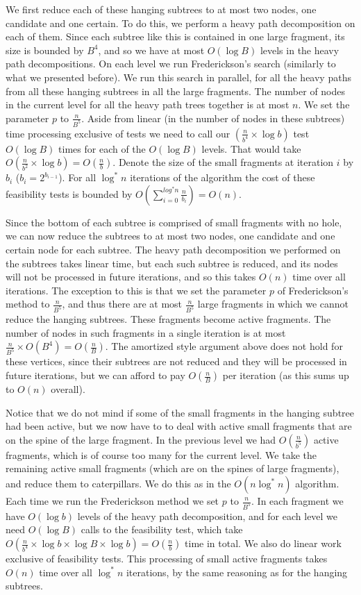 \documentclass[11pt,a4paper]{article}
\theoremstyle{definition}
\theoremstyle{remark}
\begin{document}
We first reduce each of these hanging subtrees to at most two nodes, one candidate and one certain. To do this, we perform a heavy path decomposition on each of them. Since each subtree like this is contained in one large fragment, its size is bounded by $B^4$, and so we have at most $O(\log B)$ levels in the heavy path decompositions. On each level we run Frederickson's search (similarly to what we presented before). We run this search in parallel, for all the heavy paths from all these hanging subtrees in all the large fragments. The number of nodes in the current level for all the heavy path trees together is at most $n$. We set the parameter $p$ to $\frac{n}{B^5}$. Aside from linear (in the number of nodes in these subtrees) time processing exclusive of tests we need to call our $(\frac{n}{b^4} \times \log b)$ test $O(\log B)$ times for each of the $O(\log B)$ levels. That would take $O(\frac{n}{b^2} \times \log b) = O(\frac{n}{b})$. Denote the size of the small fragments at iteration $i$ by $b_i$ ($b_i=2^{b_{i-1}}$). For all $\log ^*n$ iterations of the algorithm the cost of these feasibility tests is bounded by $O(\sum_{i=0}^{log^*n} \frac{n}{b_i}) = O(n)$.

Since the bottom of each subtree is comprised of small fragments with no hole, we can now reduce the subtrees to at most two nodes, one candidate and one certain node for each subtree. The heavy path decomposition we performed on the subtrees takes linear time, but each such subtree is reduced, and its nodes will not be processed in future iterations, and so this takes $O(n)$ time over all iterations. The exception to this is that we set the parameter $p$ of Frederickson's method to $\frac{n}{B^5}$, and thus there are at most $\frac{n}{B^5}$ large fragments in which we cannot reduce the hanging subtrees. These fragments become active fragments. The number of nodes in such fragments in a single iteration is at most $\frac{n}{B^5} \times O(B^4) = O(\frac{n}{B})$. The amortized style argument above does not hold for these vertices, since their subtrees are not reduced and they will be processed in future iterations, but we can afford to pay $O(\frac{n}{B})$ per iteration (as this sums up to $O(n)$ overall).

Notice that we do not mind if some of the small fragments in the hanging subtree had been active, but we now have to to deal with active small fragments that are on the spine of the large fragment. In the previous level we had $O(\frac{n}{b^5})$ active fragments, which is of course too many for the current level. We take the remaining active small fragments (which are on the spines of large fragments), and reduce them to caterpillars. We do this as in the $O(n \log^* n)$ algorithm. Each time we run the Frederickson method we set $p$ to $\frac{n}{B^5}$. In each fragment we have $O(\log b)$ levels of the heavy path decomposition, and for each level we need $O(\log B)$ calls to the feasibility test, which take  $O(\frac{n}{b^4} \times \log b \times \log B \times \log b) = O(\frac{n}{b})$ time in total. We also do linear work exclusive of feasibility tests. This processing of small active fragments takes $O(n)$ time over all $\log ^*n$ iterations, by the same reasoning as for the hanging subtrees.
\end{document}
